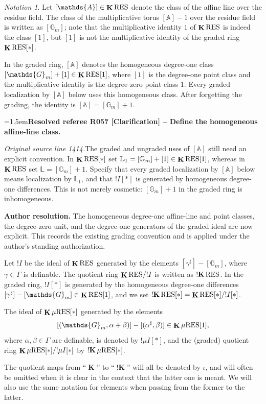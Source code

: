 \documentclass[12pt]{amsart}
\newcommand{\ResolvedRefereeRemark}[5]{%
  \par\medskip\begingroup\normalfont\small\color{gray}%
  \emergencystretch=1.5em\noindent\textbf{Resolved referee R#1 [#2] -- #3.}\par\nobreak\noindent #4\par
  \medskip\color{ResolutionGreen}\noindent\textbf{Author resolution.} #5\par
  \endgroup\medskip
}
\theoremstyle{plain}
\theoremstyle{definition}
\theoremstyle{remark}
\newtheorem{nota}[thm]{Notation}
\numberwithin{equation}{section}
\theoremstyle{plain}
\newcommand{\A}{\mathds{A}}
\newcommand{\G}{\mathds{G}}
\newcommand{\0}{\emptyset}
\newcommand{\RES}{\textup{RES}}
\newcommand{\mgRES}{{\mu}{\RES}}
\DeclareMathOperator{\ggk}{\mathbf{K}}
\DeclareMathOperator{\sggk}{!\mathbf{K}}
\begin{document}
\begin{nota}\label{res:note}
Let $[\A] \in \ggk \RES$ denote the class of the affine line over the residue field. The class of the multiplicative torus $[\A] - 1$ over the residue field is written as $[\G_m]$; note that the multiplicative identity $1$ of $\ggk \RES$ is indeed the class $[1]$, but $[1]$ is not the multiplicative identity of the graded ring $\ggk \RES[*]$.

In the graded ring, $[\A]$ denotes the homogeneous degree-one class $[\G_m]+[1]\in\ggk\RES[1]$, where $[1]$ is the degree-one point class and the multiplicative identity is the degree-zero point class $1$. Every graded localization by $[\A]$ below uses this homogeneous class. After forgetting the grading, the identity is $[\A]=[\G_m]+1$.

\ResolvedRefereeRemark{057}{Clarification}{Define the homogeneous affine-line class}{%
\textit{Original source line 1414.}\quad The graded and ungraded uses of $[\mathbb A]$ still need an explicit convention. In $\ggk\RES[*]$ set $\mathbb L_1=[\mathbb G_m]+[1]\in\ggk\RES[1]$, whereas in $\ggk\RES$ set $\mathbb L=[\mathbb G_m]+1$. Specify that every graded localization by $[\mathbb A]$ below means localization by $\mathbb L_1$, and that $!I[*]$ is generated by homogeneous degree-one differences. This is not merely cosmetic: $[\mathbb G_m]+1$ in the graded ring is inhomogeneous.
}{The homogeneous degree-one affine-line and point classes, the degree-zero unit, and the degree-one generators of the graded ideal are now explicit. This records the existing grading convention and is applied under the author's standing authorization.}

Let $!I$ be the ideal of $\ggk \RES$ generated by the elements $[\gamma^\sharp] - [\G_m]$, where $\gamma \in \Gamma$ is definable. The quotient ring $\ggk \RES / !I$ is written as $\sggk \RES$. In the graded ring, $!I[*]$ is generated by the homogeneous degree-one differences $[\gamma^\sharp]-[\G_m]\in\ggk\RES[1]$, and we set $\sggk\RES[*]=\ggk\RES[*]/!I[*]$.

The ideal of $\ggk \mgRES[*]$ generated by the  elements
\[
[(\G_m, \alpha + \beta)] - [(\alpha^\sharp, \beta)] \in \ggk \mgRES[1],
\]
where $\alpha, \beta \in \Gamma$ are definable, is denoted by $!\mu I[*]$, and the (graded) quotient ring $\ggk \mgRES[*] / !\mu I[*]$ by $\sggk \mgRES[*]$.
\end{nota}
\label{review:section4:opening:end}


The quotient maps from ``$\ggk$'' to ``$\sggk$'' will all be denoted by $\iota$, and will often be omitted when it is clear in the context that the latter one is meant. We will also use the same notation for elements when passing from the former to the latter.
\end{document}
